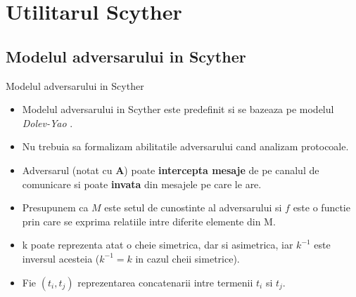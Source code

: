 \documentclass[11pt]{beamer}
\begin{document}
\section{Utilitarul Scyther}
\subsection{Modelul adversarului in Scyther}

\begin{frame}[t,allowframebreaks]{Modelul adversarului in Scyther}
\begin{itemize}

\item Modelul adversarului in Scyther este predefinit si se bazeaza pe modelul \textit{Dolev-Yao} \cite{dolevyao}.

\item Nu trebuia sa formalizam abilitatile adversarului cand analizam protocoale.

\item Adversarul (notat cu \textbf{A}) poate \textbf{intercepta mesaje} de pe canalul de comunicare si poate \textbf{invata} din mesajele pe care le are.

\item Presupunem ca $M$ este setul de cunostinte al adversarului si $f$ este o functie prin care se exprima relatiile intre diferite elemente din M.

\item k poate reprezenta atat o cheie simetrica, dar si asimetrica, iar $k^{-1}$ este inversul acesteia ($k^{-1}=k$ in cazul cheii simetrice).

\item Fie $(t_i,t_j)$ reprezentarea concatenarii intre termenii $t_i$ si $t_j$.

\begin{itemize}


\end{itemize}
\end{itemize}
\end{frame}
\end{document}
